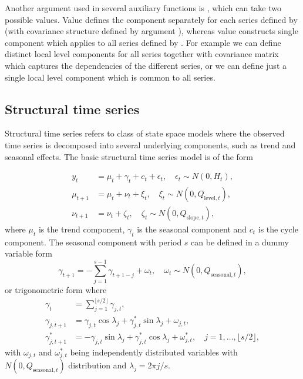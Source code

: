 \documentclass[nojss,article]{jss}\usepackage[]{graphicx}\usepackage[]{color}
\begin{document}
Another argument used in several auxiliary functions is , which can take two possible values. Value  defines the component separately for each series defined by  (with covariance structure defined by argument ), whereas value  constructs single component which applies to all series defined by . For example we can define distinct local level components for all series together with covariance matrix which captures the dependencies of the different series, or we can define just a single local level component which is common to all series.


\subsection{Structural time series}

Structural time series refers to class of state space models where the observed time series is decomposed into several underlying components, such as trend and seasonal effects. The basic structural time series model is of the form

\begin{equation}
\begin{aligned}\label{structural}
y_t       &= \mu_t + \gamma_t + c_t + \epsilon_t, \quad \epsilon_t \sim N(0, H_t),\\
\mu_{t+1} &= \mu_t + \nu_t + \xi_t, \quad \xi_t \sim N(0, Q_{\textrm{level},t}), \\ 
\nu_{t+1} &= \nu_t + \zeta_t, \quad \zeta_t \sim N(0, Q_{\textrm{slope},t}),
\end{aligned}
\end{equation}
where $\mu_t$ is the trend component, $\gamma_t$ is the seasonal component and $c_t$ is the cycle component. The seasonal component with period $s$ can be defined in a dummy variable form
\begin{equation*}
\gamma_{t+1} = -\sum_{j=1}^{s-1}\gamma_{t+1-j} + \omega_t, \quad \omega_t \sim N(0,Q_{\textrm{seasonal},t}),
\end{equation*}
or trigonometric form where
\begin{equation*}
\begin{aligned}
\gamma_{t} &= \sum_{j=1}^{\lfloor s/2 \rfloor}\gamma_{j,t}, \\
\gamma_{j,t+1} &= \gamma_{j,t} \cos\lambda_j + \gamma^{\ast}_{j,t} \sin\lambda_j + \omega_{j,t}, \\
\gamma^{\ast}_{j,t+1} &= - \gamma_{j,t} \sin\lambda_j + \gamma^{\ast}_{j,t} \cos\lambda_j + \omega^{\ast}_{j,t}, \quad j=1,\ldots, \lfloor s/2 \rfloor,
\end{aligned}
\end{equation*}
with $\omega_{j,t}$ and $\omega^{\ast}_{j,t}$ being independently distributed variables with $N(0, Q_{\textrm{seasonal},t})$ distribution and $\lambda_j = 2\pi j/s$.
\end{document}
